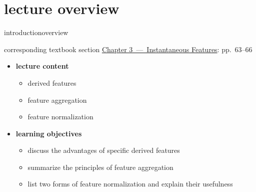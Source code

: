 



\subtitle{Module 3.4: Feature Extraction~---~Feature Postprocessing}


	

    \section[overview]{lecture overview}
        \begin{frame}{introduction}{overview}
            \begin{block}{corresponding textbook section}
                    \href{http://ieeexplore.ieee.org/xpl/articleDetails.jsp?arnumber=6331120}{Chapter 3~---~Instantaneous Features}: pp.~63--66
            \end{block}

            \begin{itemize}
                \item   \textbf{lecture content}
                    \begin{itemize}
                        \item       derived features
                        \item       feature aggregation
                        \item       feature normalization
                    \end{itemize}
                \bigskip
                \item<2->   \textbf{learning objectives}
                    \begin{itemize}
                        \item       discuss the advantages of specific derived features
                        \item       summarize the principles of feature aggregation
                        \item       list two forms of feature normalization and explain their usefulness
                    \end{itemize}
            \end{itemize}
        \end{frame}

